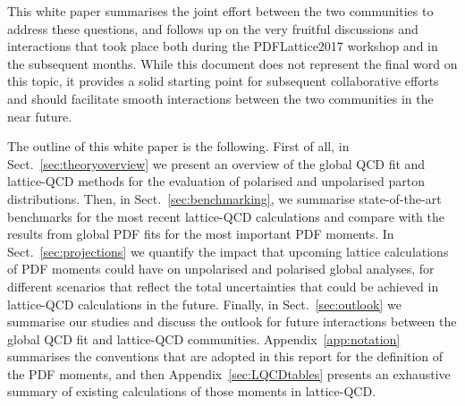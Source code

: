 This white paper summarises the joint
effort between the two communities to address these questions, 
and follows up on the very fruitful discussions and interactions that took place both during 
the PDFLattice2017 workshop and in the subsequent months.
%
While this document does not represent the final word on this topic,
it provides a solid starting point for subsequent collaborative efforts
and should facilitate smooth 
interactions between the two communities in the near future.

The outline of this white paper is the following.
%
First of all, in Sect.~\ref{sec:theoryoverview} we present an overview of
the global QCD fit and lattice-QCD methods for the evaluation
of polarised and unpolarised parton distributions.
%
Then, in Sect.~\ref{sec:benchmarking},
we summarise state-of-the-art benchmarks for the most
recent lattice-QCD calculations and compare with the results from global PDF fits
for the most important PDF moments.
%
In Sect.~\ref{sec:projections} we quantify the impact that
upcoming lattice calculations of PDF moments could have on unpolarised
and polarised global analyses, for different scenarios
that reflect the total uncertainties that could be achieved in lattice-QCD 
calculations in the future.
%
Finally, in Sect.~\ref{sec:outlook} we summarise our studies
and discuss the outlook for future interactions between
the global QCD fit and lattice-QCD communities.
%
Appendix~\ref{app:notation} summarises the conventions
that are adopted in this report for the definition of the PDF
moments, and then
Appendix~\ref{sec:LQCDtables} presents an exhaustive summary of existing calculations
of those moments in lattice-QCD.

